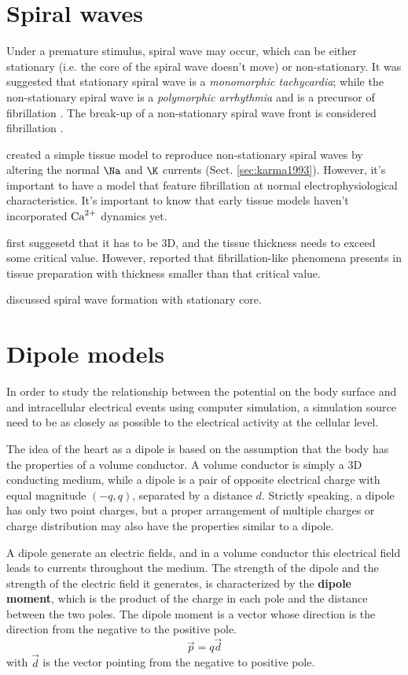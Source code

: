 \section{Spiral waves}
\label{sec:spiral_wave}

Under a premature stimulus, spiral wave may occur, which can be either
stationary (i.e. the core of the spiral wave doesn't move) or non-stationary. It
was suggested that stationary spiral wave is a {\it monomorphic tachycardia};
while the non-stationary spiral wave is a {\it polymorphic arrhythmia} and is a
precursor of fibrillation \citep{winfree1995}. The break-up of a non-stationary
spiral wave front is considered fibrillation \citep{Karma1993}.

\citep{Karma1993} created a simple tissue model to reproduce non-stationary
spiral waves by altering the normal $\Na$ and $\K$ currents (Sect.
\ref{sec:karma1993}). However, it's important to have a model that feature
fibrillation at normal electrophysiological characteristics. It's important to
know that early tissue models haven't incorporated ${\text{Ca}^{2+}}$ dynamics yet.

\citep{winfree1994} first suggesetd that it has to be 3D, and the tissue
thickness needs to exceed some critical value. However, \citep{gray1995}
reported that fibrillation-like phenomena presents in tissue preparation with
thickness smaller than that critical value. 

\citep{beaumont1998} discussed spiral wave formation with stationary core.

\section{Dipole models}

In order to study the relationship between the potential on the body surface and
and intracellular electrical events using computer simulation, a simulation
source need to be as closely as possible to the electrical activity at the
cellular level. 

The idea of the heart as a dipole is based on the assumption that the body has
the properties of a volume conductor. A volume conductor is simply a 3D
conducting medium, while a dipole is a pair of opposite electrical charge with
equal magnitude $(-q,q)$, separated by a distance $d$. Strictly speaking, a
dipole has only two point charges, but a proper arrangement of multiple charges
or charge distribution may also have the properties similar to a dipole. 

A dipole generate an electric fields, and in a volume conductor this electrical
field leads to currents throughout the medium. The strength of the dipole and
the strength of the electric field it generates, is characterized by the {\bf
dipole moment}, which is the product of the charge in each pole and the distance
between the two poles. The dipole moment is a vector whose direction is the
direction from the negative to the positive pole.
\begin{equation}
\vec{p}=q\vec{d}
\end{equation}
with $\vec{d}$ is the vector pointing from the negative to positive pole.


